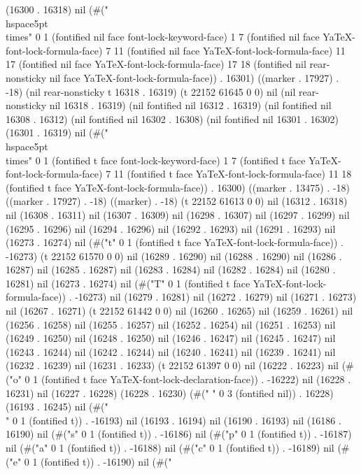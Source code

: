 (16300 . 16318) nil (#("\\hspace{5pt}\\times" 0 1 (fontified nil face font-lock-keyword-face) 1 7 (fontified nil face YaTeX-font-lock-formula-face) 7 11 (fontified nil face YaTeX-font-lock-formula-face) 11 17 (fontified nil face YaTeX-font-lock-formula-face) 17 18 (fontified nil rear-nonsticky nil face YaTeX-font-lock-formula-face)) . 16301) ((marker . 17927) . -18) (nil rear-nonsticky t 16318 . 16319) (t 22152 61645 0 0) nil (nil rear-nonsticky nil 16318 . 16319) (nil fontified nil 16312 . 16319) (nil fontified nil 16308 . 16312) (nil fontified nil 16302 . 16308) (nil fontified nil 16301 . 16302) (16301 . 16319) nil (#("\\hspace{5pt}\\times" 0 1 (fontified t face font-lock-keyword-face) 1 7 (fontified t face YaTeX-font-lock-formula-face) 7 11 (fontified t face YaTeX-font-lock-formula-face) 11 18 (fontified t face YaTeX-font-lock-formula-face)) . 16300) ((marker . 13475) . -18) ((marker . 17927) . -18) ((marker) . -18) (t 22152 61613 0 0) nil (16312 . 16318) nil (16308 . 16311) nil (16307 . 16309) nil (16298 . 16307) nil (16297 . 16299) nil (16295 . 16296) nil (16294 . 16296) nil (16292 . 16293) nil (16291 . 16293) nil (16273 . 16274) nil (#("t" 0 1 (fontified t face YaTeX-font-lock-formula-face)) . -16273) (t 22152 61570 0 0) nil (16289 . 16290) nil (16288 . 16290) nil (16286 . 16287) nil (16285 . 16287) nil (16283 . 16284) nil (16282 . 16284) nil (16280 . 16281) nil (16273 . 16274) nil (#("T" 0 1 (fontified t face YaTeX-font-lock-formula-face)) . -16273) nil (16279 . 16281) nil (16272 . 16279) nil (16271 . 16273) nil (16267 . 16271) (t 22152 61442 0 0) nil (16260 . 16265) nil (16259 . 16261) nil (16256 . 16258) nil (16255 . 16257) nil (16252 . 16254) nil (16251 . 16253) nil (16249 . 16250) nil (16248 . 16250) nil (16246 . 16247) nil (16245 . 16247) nil (16243 . 16244) nil (16242 . 16244) nil (16240 . 16241) nil (16239 . 16241) nil (16232 . 16239) nil (16231 . 16233) (t 22152 61397 0 0) nil (16222 . 16223) nil (#("o" 0 1 (fontified t face YaTeX-font-lock-declaration-face)) . -16222) nil (16228 . 16231) nil (16227 . 16228) (16228 . 16230) (#("   " 0 3 (fontified nil)) . 16228) (16193 . 16245) nil (#("\\" 0 1 (fontified t)) . -16193) nil (16193 . 16194) nil (16190 . 16193) nil (16186 . 16190) nil (#("s" 0 1 (fontified t)) . -16186) nil (#("p" 0 1 (fontified t)) . -16187) nil (#("a" 0 1 (fontified t)) . -16188) nil (#("c" 0 1 (fontified t)) . -16189) nil (#("e" 0 1 (fontified t)) . -16190) nil (#("

